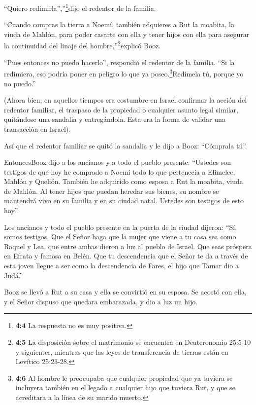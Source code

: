 ``Quiero redimirla'',''\footnote{\textbf{4:4} La respuesta no es muy
  positiva.}dijo el redentor de la familia.

 ``Cuando compras la tierra a Noemí, también adquieres a Rut
la moabita, la viuda de Mahlón, para poder casarte con ella y tener
hijos con ella para asegurar la continuidad del linaje del
hombre,''\footnote{\textbf{4:5} La disposición sobre el matrimonio se
  encuentra en Deuteronomio 25:5-10 y siguientes, mientras que las leyes
  de transferencia de tierras están en Levítico 25:23-28.}explicó Booz.

 ``Pues entonces no puedo hacerlo'', respondió el redentor
de la familia. ``Si la redimiera, eso podría poner en peligro lo que ya
poseo.\footnote{\textbf{4:6} Al hombre le preocupaba que cualquier
  propiedad que ya tuviera se incluyera también en el legado a cualquier
  hijo que tuviera Rut, y que se acreditara a la línea de su marido
  muerto.}Redímela tú, porque yo no puedo.''

 (Ahora bien, en aquellos tiempos era costumbre en Israel
confirmar la acción del redentor familiar, el traspaso de la propiedad o
cualquier asunto legal similar, quitándose una sandalia y entregándola.
Esta era la forma de validar una transacción en Israel).

 Así que el redentor familiar se quitó la sandalia y le dijo
a Booz: ``Cómprala tú''.

 EntoncesBooz dijo a los ancianos y a todo el pueblo
presente: ``Ustedes son testigos de que hoy he comprado a Noemí todo lo
que pertenecía a Elimelec, Mahlón y Quelión.  También he
adquirido como esposa a Rut la moabita, viuda de Mahlón. Al tener hijos
que puedan heredar sus bienes, su nombre se mantendrá vivo en su familia
y en su ciudad natal. Ustedes son testigos de esto hoy''.

 Los ancianos y todo el pueblo presente en la puerta de la
ciudad dijeron: ``Sí, somos testigos. Que el Señor haga que la mujer que
viene a tu casa sea como Raquel y Lea, que entre ambas dieron a luz al
pueblo de Israel. Que seas próspera en Efrata y famosa en Belén.
 Que tu descendencia que el Señor te da a través de esta
joven llegue a ser como la descendencia de Fares, el hijo que Tamar dio
a Judá.''

 Booz se llevó a Rut a su casa y ella se convirtió en su
esposa. Se acostó con ella, y el Señor dispuso que quedara embarazada, y
dio a luz un hijo.

